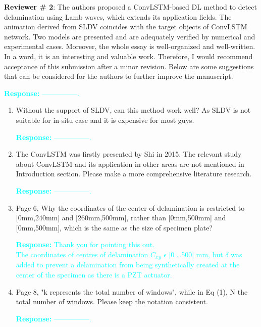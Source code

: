 \documentclass[11pt,a2paper]{report}
\begin{document}
\newpage 
\textbf{Reviewer \# 2}:
\newline The authors proposed a ConvLSTM-based DL method to detect delamination 
using Lamb waves, which extends its application fields. The animation derived 
from SLDV coincides with the target objects of ConvLSTM network. Two models are 
presented and are adequately verified by numerical and experimental cases. 
Moreover, the whole essay is well-organized and well-written. In a word, it is 
an interesting and valuable work. Therefore, I would recommend acceptance of 
this submission after a minor revision. Below are some suggestions that can be 
considered for the authors to further improve the manuscript.

\textcolor{Cyan}{
	\newline\textbf{Response:}
	---------------.
}
\begin{enumerate}
	\item Without the support of SLDV, can this method work well? As SLDV is 
	not suitable for in-situ case and it is expensive for most guys.
	
	\textcolor{Cyan}{
		\textbf{Response:}
		---------------.
	}
	
	\item The ConvLSTM was firstly presented by Shi in 2015. The relevant study 
	about ConvLSTM and its application in other areas are not mentioned in 
	Introduction section. Please make a more comprehensive literature research.
	
	\textcolor{Cyan}{
		\textbf{Response:}
		---------------.
	}
	\item Page 6, Why the coordinates of the center of delamination is 
	restricted to [0mm,240mm] and [260mm,500mm], rather than [0mm,500mm] and 
	[0mm,500mm], which is the same as the size of specimen plate?
	
	\textcolor{Cyan}{
		\textbf{Response:}
		Thank you for pointing this out.\\
		The coordinates of centres of delamination \(C_{xy}\) $\epsilon$ [0 \dots 500] mm, but $\delta$ was added to prevent a delamination from being synthetically created at the center of the specimen as there is a PZT actuator.
	}
	
	\item Page 8, "k represents the total number of windows", while in Eq (1), 
	N the total number of windows. Please keep the notation consistent.
	
	\textcolor{Cyan}{
		\textbf{Response:}
		---------------.
	}	
	

\end{enumerate}
\end{document}
